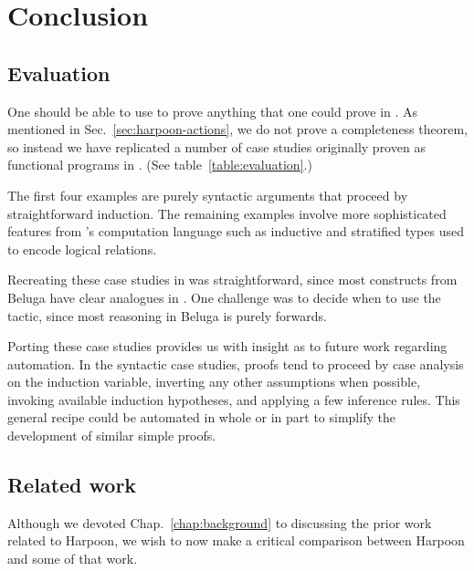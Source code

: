 \chapter{Conclusion}

\section{Evaluation}
\label{sec:evaluation}

One should be able to use \Harpoon{} to prove anything that one could prove in
\Beluga. As mentioned in Sec.~\ref{sec:harpoon-actions}, we do not prove a
completeness theorem, so instead we have replicated a number of case studies
originally proven as functional programs in \Beluga.
(See table~\ref{table:evaluation}.)

\begin{table}[h]
  \centering
  
  \caption{%
    Summary of proofs ported to \Harpoon{} from \Beluga.
  }
  \label{table:evaluation}
\end{table}

The first four examples are purely syntactic arguments that proceed by
straightforward induction.
The remaining examples involve more sophisticated features from \Beluga's
computation language such as inductive and stratified types used to encode
logical relations.

Recreating these case studies in \Harpoon{} was straightforward, since most
constructs from Beluga have clear analogues in \Harpoon.
One challenge was to decide when to use the \ttsufficess tactic, since most
reasoning in Beluga is purely forwards.

Porting these case studies provides us with insight as to future work regarding
automation.
In the syntactic case studies, proofs tend to proceed by case analysis on the
induction variable, inverting any other assumptions when possible, invoking
available induction hypotheses, and applying a few inference rules.
This general recipe could be automated in whole or in part to simplify the
development of similar simple proofs.

\section{Related work}
\label{sec:related-work}

Although we devoted Chap.~\ref{chap:background} to discussing the prior work
related to Harpoon, we wish to now make a critical comparison between Harpoon
and some of that work.

